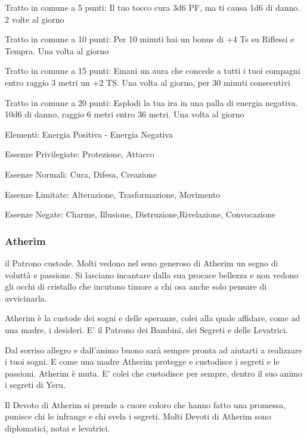 \documentclass[a4paper,11pt,twoside,openany]{book}
\begin{document}
\bigskip

Tratto in comune a 5 punti: Il tuo tocco cura 3d6 PF, ma ti causa 1d6 di danno. 2 volte al giorno

Tratto in comune a 10 punti: Per 10 minuti hai un bonus di +4 Ts su Riflessi e Tempra. Una volta al giorno

Tratto in comune a 15 punti: Emani un aura che concede a tutti i tuoi compagni entro raggio 3 metri un +2 TS. Una volta al giorno, per 30 minuti consecutivi

Tratto in comune a 20 punti: Esplodi la tua ira in una palla di energia negativa. 10d6 di danno, raggio 6 metri entro 36 metri. Una volta al giorno

\bigskip

Elementi: Energia Positiva - Energia Negativa

\bigskip

Essenze Privilegiate: Protezione, Attacco

Essenze Normali: Cura, Difesa, Creazione

Essenze Limitate: Alterazione, Trasformazione, Movimento

Essenze Negate: Charme, Illusione, Distruzione,Rivelazione, Convocazione

\subsubsection{Atherim}

\label{atherim}

il Patrono custode. Molti vedono nel seno generoso di Atherim un segno di voluttà e passione. Si lasciano incantare dalla sua procace bellezza e non vedono gli occhi di cristallo che incutono timore a chi osa anche solo pensare di avvicinarla.

Atherim è la custode dei sogni e delle speranze, colei alla quale affidare, come ad una madre, i desideri. E' il Patrono dei Bambini, dei Segreti e delle Levatrici.

Dal sorriso allegro e dall'animo buono sarà sempre pronta ad aiutarti a realizzare i tuoi sogni. E come una madre Atherim protegge e custodisce i segreti e le passioni. Atherim è muta. E' colei che custodisce per sempre, dentro il suo animo i segreti di Yeru.

Il Devoto di Atherim si prende a cuore coloro che hanno fatto una promessa, punisce chi le infrange e chi svela i segreti. Molti Devoti di Atherim sono diplomatici, notai e levatrici.
\end{document}
